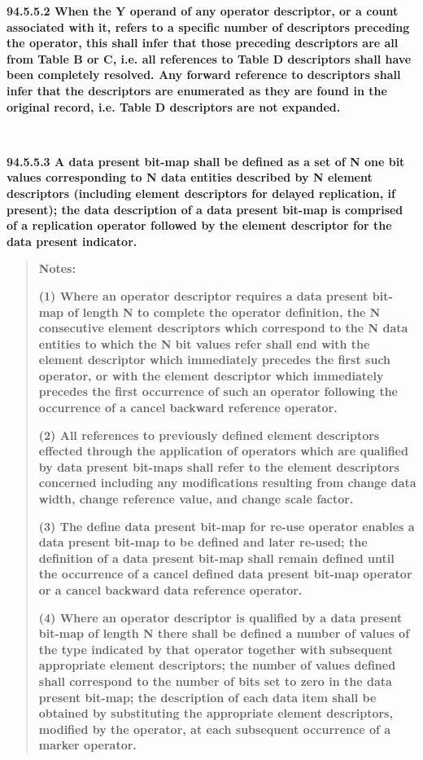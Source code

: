 \textbf{94.5.5.2 When the Y operand of any operator descriptor, or a count associated with it, refers to a specific number of descriptors preceding the operator, this shall infer that those preceding descriptors are all from Table B or C, i.e. all references to Table D descriptors shall have been completely resolved. Any forward reference to descriptors shall infer that the descriptors are enumerated as they are found in the original record, i.e. Table D descriptors are not expanded.}

\textbf{\\
}

\textbf{94.5.5.3 A data present bit-map shall be defined as a set of N one bit values corresponding to N data entities described by N element descriptors (including element descriptors for delayed replication, if present); the data description of a data present bit-map is comprised of a replication operator followed by the element descriptor for the data present indicator.}

\begin{quote}
\textbf{Notes:}

\textbf{(1) Where an operator descriptor requires a data present bit-map of length N to complete the operator definition, the N consecutive element descriptors which correspond to the N data entities to which the N bit values refer shall end with the element descriptor which immediately precedes the first such operator, or with the element descriptor which immediately precedes the first occurrence of such an operator following the occurrence of a cancel backward reference operator.}

\textbf{(2) All references to previously defined element descriptors effected through the application of operators which are qualified by data present bit-maps shall refer to the element descriptors concerned including any modifications resulting from change data width, change reference value, and change scale factor.}

\textbf{(3) The define data present bit-map for re-use operator enables a data present bit-map to be defined and later re-used; the definition of a data present bit-map shall remain defined until the occurrence of a cancel defined data present bit-map operator or a cancel backward data reference operator.}

\textbf{(4) Where an operator descriptor is qualified by a data present bit-map of length N there shall be defined a number of values of the type indicated by that operator together with subsequent appropriate element descriptors; the number of values defined shall correspond to the number of bits set to zero in the data present bit-map; the description of each data item shall be obtained by substituting the appropriate element descriptors, modified by the operator, at each subsequent occurrence of a marker operator.}
\end{quote}

